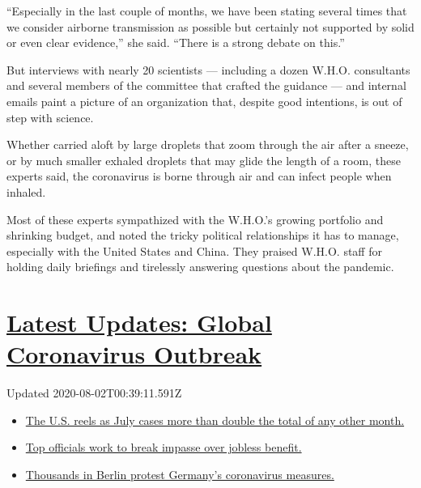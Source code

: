 ``Especially in the last couple of months, we have been stating several
times that we consider airborne transmission as possible but certainly
not supported by solid or even clear evidence,'' she said. ``There is a
strong debate on this.''

But interviews with nearly 20 scientists --- including a dozen W.H.O.
consultants and several members of the committee that crafted the
guidance --- and internal emails paint a picture of an organization
that, despite good intentions, is out of step with science.

Whether carried aloft by large droplets that zoom through the air after
a sneeze, or by much smaller exhaled droplets that may glide the length
of a room, these experts said, the coronavirus is borne through air and
can infect people when inhaled.

Most of these experts sympathized with the W.H.O.'s growing portfolio
and shrinking budget, and noted the tricky political relationships it
has to manage, especially with the United States and China. They praised
W.H.O. staff for holding daily briefings and tirelessly answering
questions about the pandemic.

\hypertarget{latest-updates-global-coronavirus-outbreak}{%
\section{\texorpdfstring{\href{https://www.nytimes.com/2020/08/01/world/coronavirus-covid-19.html?action=click\&pgtype=Article\&state=default\&region=MAIN_CONTENT_1\&context=storylines_live_updates}{Latest
Updates: Global Coronavirus
Outbreak}}{Latest Updates: Global Coronavirus Outbreak}}\label{latest-updates-global-coronavirus-outbreak}}

Updated 2020-08-02T00:39:11.591Z

\begin{itemize}
\tightlist
\item
  \href{https://www.nytimes.com/2020/08/01/world/coronavirus-covid-19.html?action=click\&pgtype=Article\&state=default\&region=MAIN_CONTENT_1\&context=storylines_live_updates\#link-34047410}{The
  U.S. reels as July cases more than double the total of any other
  month.}
\item
  \href{https://www.nytimes.com/2020/08/01/world/coronavirus-covid-19.html?action=click\&pgtype=Article\&state=default\&region=MAIN_CONTENT_1\&context=storylines_live_updates\#link-3ac56579}{Top
  officials work to break impasse over jobless benefit.}
\item
  \href{https://www.nytimes.com/2020/08/01/world/coronavirus-covid-19.html?action=click\&pgtype=Article\&state=default\&region=MAIN_CONTENT_1\&context=storylines_live_updates\#link-25930521}{Thousands
  in Berlin protest Germany's coronavirus measures.}
\end{itemize}

